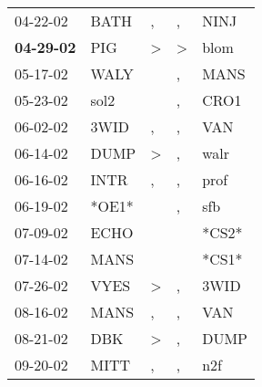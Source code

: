 \begin{supertabular}{p{0.07\textwidth}p{0.06\textwidth}p{0.02\textwidth}p{0.02\textwidth}p{0.06\textwidth}}
          04-22-02\textsuperscript{} &           BATH\textsuperscript{} &                , &                , &           NINJ\textsuperscript{} \\
 \textbf{04-29-02\textsuperscript{}} &            PIG\textsuperscript{} &     \textgreater &     \textgreater &           blom\textsuperscript{} \\
          05-17-02\textsuperscript{} &           WALY\textsuperscript{} &                  &                , &           MANS\textsuperscript{} \\
          05-23-02\textsuperscript{} &           sol2\textsuperscript{} &                  &                , &           CRO1\textsuperscript{} \\
          06-02-02\textsuperscript{} &           3WID\textsuperscript{} &                , &                , &            VAN\textsuperscript{} \\
          06-14-02\textsuperscript{} &           DUMP\textsuperscript{} &     \textgreater &                , &           walr\textsuperscript{} \\
          06-16-02\textsuperscript{} &           INTR\textsuperscript{} &                , &                , &           prof\textsuperscript{} \\
          06-19-02\textsuperscript{} &                            *OE1* &                  &                , &            sfb\textsuperscript{} \\
          07-09-02\textsuperscript{} &           ECHO\textsuperscript{} &                  &                  &                            *CS2* \\
          07-14-02\textsuperscript{} &           MANS\textsuperscript{} &                  &                  &                            *CS1* \\
          07-26-02\textsuperscript{} &           VYES\textsuperscript{} &     \textgreater &                , &           3WID\textsuperscript{} \\
          08-16-02\textsuperscript{} &           MANS\textsuperscript{} &                , &                , &            VAN\textsuperscript{} \\
          08-21-02\textsuperscript{} &            DBK\textsuperscript{} &     \textgreater &                , &           DUMP\textsuperscript{} \\
          09-20-02\textsuperscript{} &           MITT\textsuperscript{} &                , &                , &            n2f\textsuperscript{} \\

\end{supertabular}
